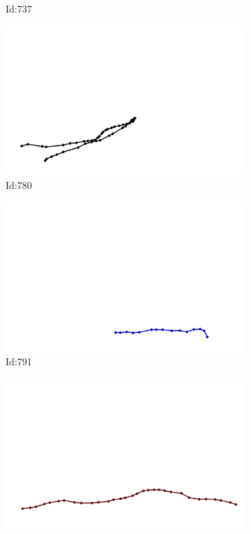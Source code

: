 \documentclass[12pt,twoside]{report}
\begin{document}
\begin{figure}
\begin{subfigure}[b]{0.20\textwidth}
\caption{Id:737}
\end{subfigure}
\begin{subfigure}[b]{0.20\textwidth}
\centering
\includegraphics[width=\textwidth]{../trajectories/780.png}
\caption{Id:780}
\end{subfigure}
\begin{subfigure}[b]{0.20\textwidth}
\centering
\includegraphics[width=\textwidth]{../trajectories/791.png}
\caption{Id:791}
\end{subfigure}
\begin{subfigure}[b]{0.20\textwidth}
\centering
\includegraphics[width=\textwidth]{../trajectories/813.png}

\end{subfigure}
\end{figure}
\end{document}
